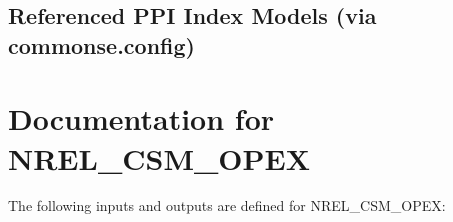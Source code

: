 \documentclass[letterpaper,10pt,openany,oneside]{sphinxmanual}
\begin{document}
\begin{fulllineitems}
\label{documentation:plant_costsse.nrel_csm_bos.nrel_csm_bos.bos_csm_component}
\end{fulllineitems}


\begin{fulllineitems}
\label{documentation:plant_costsse.nrel_csm_bos.nrel_csm_bos.bos_csm_assembly}
\end{fulllineitems}



\subsection{Referenced PPI Index Models (via commonse.config)}
\label{documentation:referenced-ppi-index-models-via-commonse-config}\label{documentation:module-commonse.csmPPI}

\begin{fulllineitems}
\label{documentation:commonse.csmPPI.PPI}
\end{fulllineitems}



\section{Documentation for NREL\_CSM\_OPEX}
\label{documentation:documentation-for-nrel-csm-opex}
The following inputs and outputs are defined for NREL\_CSM\_OPEX:
\end{document}
